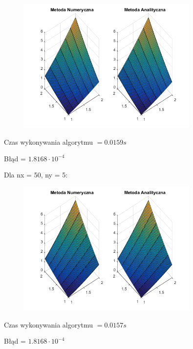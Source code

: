 \begin{figure}[!ht]
	\begin{center}
		\includegraphics[width=0.8\textwidth]{Lab5/charts/zad3/5x50.png}
	\end{center}
\end{figure}

Czas wykonywania algorytmu $ = 0.0159 s$

Błąd = $1.8168\cdot 10^{-4}$

Dla nx = 50, ny = 5:

\begin{figure}[!ht]
	\begin{center}
		\includegraphics[width=0.8\textwidth]{Lab5/charts/zad3/50x5.png}
	\end{center}
\end{figure}

Czas wykonywania algorytmu $ = 0.0157 s$

Błąd = $1.8168\cdot 10^{-4}$


\newpage
